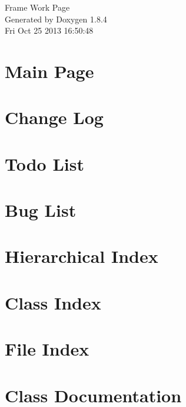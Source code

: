 \documentclass[twoside]{article}
\begin{document}
\hypersetup{pageanchor=false}
\begin{titlepage}
\vspace*{7cm}
\begin{center}%
{\Large Frame Work Page }\\
\vspace*{1cm}
{\large Generated by Doxygen 1.8.4}\\
\vspace*{0.5cm}
{\small Fri Oct 25 2013 16:50:48}\\
\end{center}
\end{titlepage}
\tableofcontents
{}
\hypersetup{pageanchor=true}

\section{Main Page}
\label{index}\hypertarget{index}{}
\section{Change Log}
\label{md_ChangeLog}
\hypertarget{md_ChangeLog}{}

\section{Todo List}
\label{todo}
\hypertarget{todo}{}

\section{Bug List}
\label{bug}
\hypertarget{bug}{}

\section{Hierarchical Index}

\section{Class Index}

\section{File Index}

\section{Class Documentation}






























\end{document}
